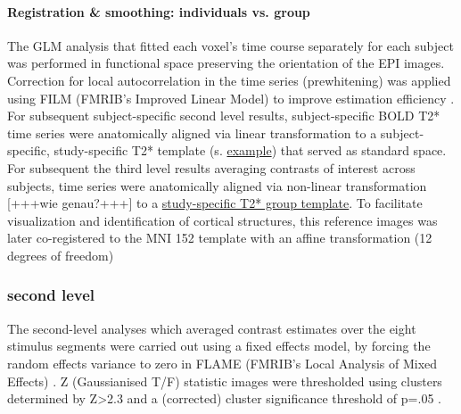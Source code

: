 \documentclass[english]{article}
\begin{document}
\paragraph{Registration \& smoothing: individuals vs. group}
The GLM analysis that fitted each voxel's time course separately for each subject was performed in functional space preserving the orientation of the EPI images.
Correction for local autocorrelation in the time series (prewhitening) was applied using FILM (FMRIB's Improved Linear Model) to improve estimation efficiency \citep{woolrich2001autocorr}.
For subsequent subject-specific second level results, subject-specific BOLD T2* time series were anatomically aligned via linear transformation to a subject-specific, study-specific T2* template (s. \href{"https://github.com/psychoinformatics-de/studyforrest-data-templatetransforms/blob/master/sub-01/bold3Tp2/brain.nii.gz"}{example}) that served as standard space.
For subsequent the third level results averaging contrasts of interest across subjects, time series were anatomically aligned via non-linear transformation [+++wie genau?+++] to a \href{"https://github.com/psychoinformatics-de/studyforrest-data-templatetransforms/blob/master/templates/grpbold3Tp2/brain.nii.gz"}{study-specific T2* group template}.
To facilitate visualization and identification of cortical structures, this reference images was later co-registered to the MNI 152 template with an affine transformation (12 degrees of freedom)
\subsubsection{second level}
The second-level analyses which averaged contrast estimates over the eight stimulus segments were carried out using a fixed effects model, by forcing the random effects variance to zero in FLAME (FMRIB's Local Analysis of Mixed Effects) \citep{beckmann2003general, woolrich2004multilevel}. Z (Gaussianised T/F) statistic images were thresholded using clusters determined by Z>2.3 and a (corrected) cluster significance threshold of p=.05 \citep{worsley2001statistical}.
\end{document}
